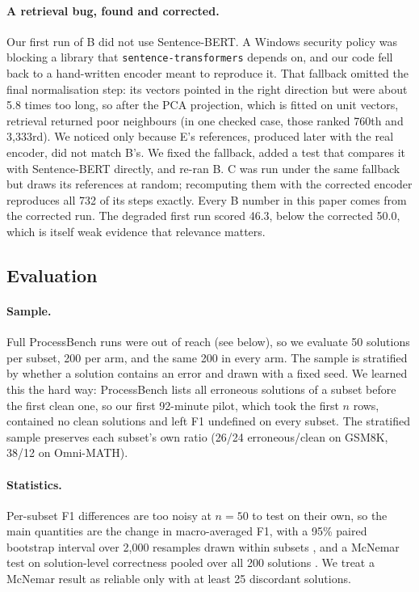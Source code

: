 \documentclass[11pt]{article}
\newcommand{\arm}[1]{\textsc{#1}}
\begin{document}
\paragraph{A retrieval bug, found and corrected.} Our first run of \arm{B} did not use
Sentence-BERT. A Windows security policy was blocking a library that \texttt{sentence-transformers}
depends on, and our code fell back to a hand-written encoder meant to reproduce it. That fallback
omitted the final normalisation step: its vectors pointed in the right direction but were about
5.8 times too long, so after the PCA projection, which is fitted on unit vectors, retrieval
returned poor neighbours (in one checked case, those ranked 760th and 3{,}333rd). We noticed only
because \arm{E}'s references, produced later with the real encoder, did not match \arm{B}'s. We
fixed the fallback, added a test that compares it with Sentence-BERT directly, and re-ran \arm{B}.
\arm{C} was run under the same fallback but draws its references at random; recomputing them with
the corrected encoder reproduces all 732 of its steps exactly. Every \arm{B} number in this paper
comes from the corrected run. The degraded first run scored 46.3, below the corrected 50.0, which
is itself weak evidence that relevance matters.

\subsection{Evaluation}

\paragraph{Sample.} Full ProcessBench runs were out of reach (see below), so we evaluate 50
solutions per subset, 200 per arm, and the same 200 in every arm. The sample is stratified by
whether a solution contains an error and drawn with a fixed seed. We learned this the hard
way: ProcessBench lists all erroneous solutions of a subset before the first clean one, so our
first 92-minute pilot, which took the first $n$ rows, contained no clean solutions and left F1
undefined on every subset. The stratified sample preserves each subset's own ratio (26/24
erroneous/clean on GSM8K, 38/12 on Omni-MATH).

\paragraph{Statistics.} Per-subset F1 differences are too noisy at $n=50$ to test on their own,
so the main quantities are the change in macro-averaged F1, with a 95\% paired bootstrap interval
over 2{,}000 resamples drawn within subsets \citep{efron1993bootstrap}, and a McNemar test on
solution-level correctness pooled over all 200 solutions \citep{mcnemar1947,dror2018hitchhiker}.
We treat a McNemar result as reliable only with at least 25 discordant solutions.
\end{document}
